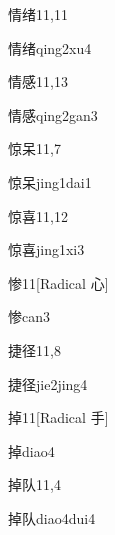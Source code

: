 \begin{entry}{情绪}{11,11}
  \begin{phonetics}{情绪}{qing2xu4}
  \end{phonetics}
\end{entry}

\begin{entry}{情感}{11,13}
  \begin{phonetics}{情感}{qing2gan3}
  \end{phonetics}
\end{entry}

\begin{entry}{惊呆}{11,7}
  \begin{phonetics}{惊呆}{jing1dai1}
  \end{phonetics}
\end{entry}

\begin{entry}{惊喜}{11,12}
  \begin{phonetics}{惊喜}{jing1xi3}
  \end{phonetics}
\end{entry}

\begin{entry}{惨}{11}[Radical 心]
  \begin{phonetics}{惨}{can3}
  \end{phonetics}
\end{entry}

\begin{entry}{捷径}{11,8}
  \begin{phonetics}{捷径}{jie2jing4}
  \end{phonetics}
\end{entry}

\begin{entry}{掉}{11}[Radical 手]
  \begin{phonetics}{掉}{diao4}
  \end{phonetics}
\end{entry}

\begin{entry}{掉队}{11,4}
  \begin{phonetics}{掉队}{diao4dui4}
  \end{phonetics}
\end{entry}

